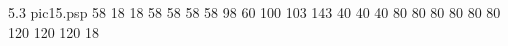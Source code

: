  5.3 pic15.psp 
{}{}{
 58 
 18 
 18 
 58 
 58 
 58 
 58 
 98 
 60 
 100 
 103 
 143 
 40 
 40 
 40 
 80 
 80 
 80 
 80 
 80 
 80 
 120 
 120 
 120 
 18 
}
